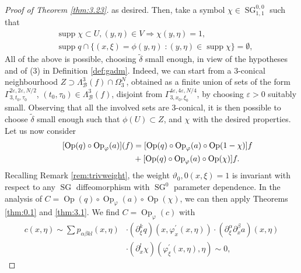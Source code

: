 \documentclass[12pt,a4paper,reqno]{amsart}
\numberwithin{equation}{section}
\numberwithin{thm}{section}
\theoremstyle{definition}
\theoremstyle{remark}
\begin{document}
\begin{proof}[Proof of Theorem \ref{thm:3.23}]
		as desired. Then, take a symbol $\chi\in{\operatorname{SG}}^{0,0}_{1,1}$ such that
				\begin{align*}
			&{\operatorname{supp}}\chi\subset U,(y,\eta)\in V\Rightarrow \chi(y,\eta)=1,
			\\
			&
			{\operatorname{supp}} q\cap \{(x,\xi)=\phi(y,\eta)\;\colon (y,\eta)\in{\operatorname{supp}}\chi\}=\emptyset,
		\end{align*}
				All of the above is possible, choosing $\tilde{\delta}$ small enough, 
		in view of the hypotheses and of (3) in Definition \ref{def:gadm}. Indeed, we can start
		from a $3$-conical neighbourhood $Z\supset \Lambda^3_{{\mathcal B}}(f)\cap\Omega_3^N$, obtained as a finite
		union of sets of the form $\Gamma_{3,t_0,\tau_0}^{2\varepsilon,2\varepsilon,N/2}$, 
		$(t_0,\tau_0)\in\Lambda^3_{{\mathcal B}}(f)$,
		disjoint from $\Gamma^{4\varepsilon,4\varepsilon,N/4}_{3,x_0,\xi_0}$, by choosing 
		$\varepsilon>0$ suitably small. Observing that all
		the involved sets are $3$-conical, it is then possible to choose 
		$\tilde{\delta}$ small enough such that $\phi(U)\subset Z$, and $\chi$ with the desired properties.
				Let us now consider
				\begin{equation}\label{eq:qa1}
		\begin{aligned}
		 \hspace*{5mm}[{\operatorname{Op}}(q)\circ{\operatorname{Op}}_\varphi(a)](f)&=[{\operatorname{Op}}(q)\circ{\operatorname{Op}}_\varphi(a)\circ{\operatorname{Op}}(1-\chi)]f
		\\
								&+[{\operatorname{Op}}(q)\circ{\operatorname{Op}}_\varphi(a)\circ{\operatorname{Op}}(\chi)]f.
		\end{aligned}
		\end{equation}
				Recalling Remark \ref{rem:trivweight}, the weight $\vartheta_0,0(x,\xi)=1$ is invariant with
		respect to any ${\operatorname{SG}}$ diffeomorphism with ${\operatorname{SG}}^0$ parameter dependence. In the analysis of
		$C={\operatorname{Op}}(q)\circ{\operatorname{Op}}_\varphi(a)\circ{\operatorname{Op}}(\chi)$, we can then apply
		Theorems \ref{thm:0.1} and \ref{thm:3.1}. We find $C={\operatorname{Op}}_\varphi(c)$ with
				\begin{align*}
			c(x,\eta)\sim\sum 
			p_{\alpha\beta k l}(x,\eta)
			&\cdot(\partial^k_\xi q)(x,\varphi^\prime_x(x,\eta))
			\cdot(\partial^\alpha_\xi\partial^\beta_x a)(x,\eta)
			\\
			&\cdot(\partial^l_x\chi)(\varphi^\prime_\xi(x,\eta),\eta)\sim 0,
		\end{align*}

\end{proof}
\end{document}
